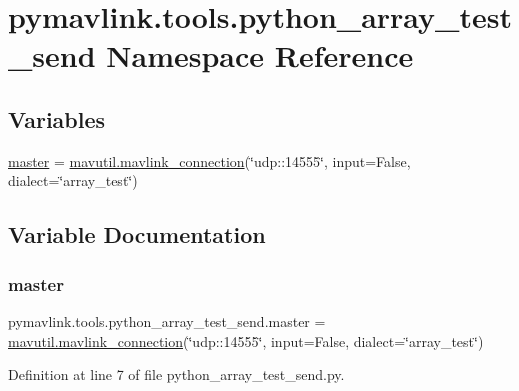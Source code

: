\hypertarget{namespacepymavlink_1_1tools_1_1python__array__test__send}{}\section{pymavlink.\+tools.\+python\+\_\+array\+\_\+test\+\_\+send Namespace Reference}
\label{namespacepymavlink_1_1tools_1_1python__array__test__send}
\subsection*{Variables}
\begin{DoxyCompactItemize}
\item 
\mbox{\hyperlink{namespacepymavlink_1_1tools_1_1python__array__test__send_a39931783564e390f67534a3a42a218ca}{master}} = \mbox{\hyperlink{namespacepymavlink_1_1mavutil_aa6c4b8861f86ef3bb746fa0fab241c93}{mavutil.\+mavlink\+\_\+connection}}(\char`\"{}udp\+::14555\char`\"{}, input=False, dialect=\char`\"{}array\+\_\+test\char`\"{})
\end{DoxyCompactItemize}


\subsection{Variable Documentation}
\mbox{\label{namespacepymavlink_1_1tools_1_1python__array__test__send_a39931783564e390f67534a3a42a218ca}} 
\subsubsection{\texorpdfstring{master}{master}}
{\footnotesize\ttfamily pymavlink.\+tools.\+python\+\_\+array\+\_\+test\+\_\+send.\+master = \mbox{\hyperlink{namespacepymavlink_1_1mavutil_aa6c4b8861f86ef3bb746fa0fab241c93}{mavutil.\+mavlink\+\_\+connection}}(\char`\"{}udp\+::14555\char`\"{}, input=False, dialect=\char`\"{}array\+\_\+test\char`\"{})}



Definition at line 7 of file python\+\_\+array\+\_\+test\+\_\+send.\+py.

